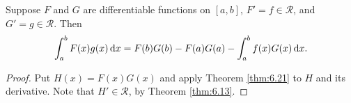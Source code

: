 \begin{thm}
    \label{thm:6.22}
    Suppose $F$ and $G$ are differentiable functions on $[a,b]$,
    $F' = f \in \mathscr{R}$, and $G' = g \in \mathscr{R}$.
    Then 
    \begin{equation*}
        \int_{a}^{b} F(x)g(x) \d x = 
        F(b)G(b) - F(a)G(a) -
        \int_{a}^{b} f(x)G(x) \d x.
    \end{equation*}
\end{thm}

\begin{proof}
    Put $H(x) = F(x)G(x)$ and apply Theorem \ref{thm:6.21} to $H$
    and its derivative. 
    Note that $H' \in \mathscr{R}$, by Theorem \ref{thm:6.13}.
\end{proof}